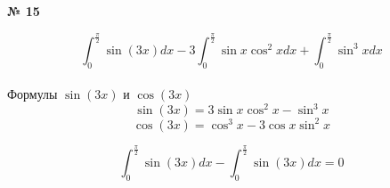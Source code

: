 \documentclass{article}
\begin{document}
\textbf{№ 15} 

$$ \int_{0}^{\frac{\pi}{2}} \sin{(3x)} dx - 3 \int_{0}^{\frac{\pi}{2}} \sin{x}\cos^2{x} dx + \int_{0}^{\frac{\pi}{2}} \sin^3{x} dx $$
\\

Формулы $\sin{(3x)}$ и $\cos{(3x)}$
$$ \sin{(3x)} = 3\sin{x}\cos^2{x} - \sin^3{x} $$
$$ \cos{(3x)} = \cos^3{x} - 3\cos{x}\sin^2{x} $$

$$ \int_{0}^{\frac{\pi}{2}} \sin{(3x)} dx - \int_{0}^{\frac{\pi}{2}} \sin{(3x)} dx
= 0 $$
\end{document}
